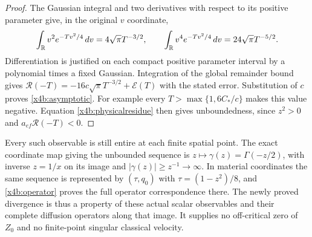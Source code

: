 \begin{proof}
The Gaussian integral and two derivatives with respect to its positive
parameter give, in the original $v$ coordinate,
\[
 \int_{\mathbb R}v^2e^{-Tv^2/4}\,dv=4\sqrt\pi T^{-3/2},\qquad
 \int_{\mathbb R}v^4e^{-Tv^2/4}\,dv=24\sqrt\pi T^{-5/2}.
\]
Differentiation is justified on each compact positive parameter
interval by a polynomial times a fixed Gaussian. Integration of the
global remainder bound gives
$\mathcal R(-T)=-16c\sqrt\pi T^{-3/2}+\mathcal E(T)$ with
the stated error. Substitution of $c$ proves \eqref{x4b:asymptotic}.
For example every $T>\max\{1,6C_*/c\}$ makes this value negative.
Equation \eqref{x4b:physicalresidue} then gives unboundedness, since
$z^2>0$ and $a_{ef}\mathcal R(-T)<0$.
\end{proof}

Every such observable is still entire at each finite spatial point.
The exact coordinate map giving the unbounded sequence is
$z\mapsto\gamma(z)=\Gamma(-z/2)$, with inverse $z=1/x$ on its
image and $|\gamma(z)|\geq z^{-1}\to\infty$. In material coordinates
the same sequence is represented by $(\tau,q_0)$ with
$\tau=(1-z^2)/8$, and \eqref{x4b:operator} proves the full operator
correspondence there. The newly proved divergence is thus a property
of these actual scalar observables and their complete diffusion
operators along that image. It supplies no off-critical zero of
$Z_0$ and no finite-point singular classical velocity.
